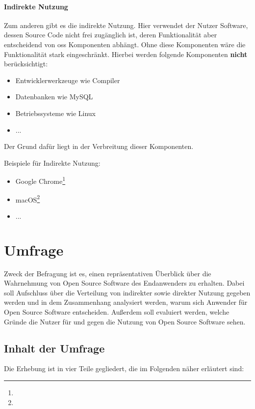 \documentclass[a4paper]{article}
\begin{document}
            \paragraph{Indirekte Nutzung}
                Zum anderen gibt es die indirekte Nutzung. Hier verwendet der Nutzer Software, dessen Source Code nicht frei zugänglich ist, deren Funktionalität aber entscheidend von \gls{oss} Komponenten abhängt. Ohne diese Komponenten wäre die Funktionalität stark eingeschränkt. Hierbei werden folgende Komponenten \textbf{nicht} berücksichtigt:
                
                \begin{itemize}
                    \item Entwicklerwerkzeuge wie Compiler
                    \item Datenbanken wie MySQL
                    \item Betriebssysteme wie Linux 
                    \item ... %
                \end{itemize}
                Der Grund dafür liegt in der Verbreitung dieser Komponenten. %
                
                Beispiele für Indirekte Nutzung:
                \begin{itemize}
                    \item Google Chrome\footnote{}
                    \item macOS\footnote{}
                    \item ... %
                \end{itemize}
        
    \section{Umfrage}
		Zweck der Befragung ist es, einen repräsentativen Überblick über die Wahrnehmung von Open Source Software des Endanwenders zu erhalten. Dabei soll Aufschluss über die Verteilung von indirekter sowie direkter Nutzung gegeben werden und in dem Zusammenhang analysiert werden, warum sich Anwender für Open Source Software entscheiden. Außerdem soll evaluiert werden, welche Gründe die Nutzer für und gegen die Nutzung von Open Source Software sehen.
	
		\subsection{Inhalt der Umfrage}
			Die Erhebung ist in vier Teile gegliedert, die im Folgenden näher erläutert sind: 
		   
\end{document}
